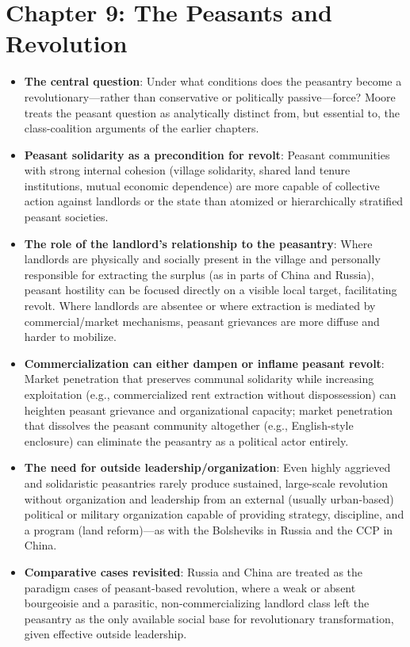 \documentclass[12pt]{article}
\begin{document}
\section{Chapter 9: The Peasants and Revolution}

\begin{itemize}[leftmargin=*, itemsep=4pt]
    \item \textbf{The central question}: Under what conditions does the peasantry become a revolutionary---rather than conservative or politically passive---force? Moore treats the peasant question as analytically distinct from, but essential to, the class-coalition arguments of the earlier chapters.
    \item \textbf{Peasant solidarity as a precondition for revolt}: Peasant communities with strong internal cohesion (village solidarity, shared land tenure institutions, mutual economic dependence) are more capable of collective action against landlords or the state than atomized or hierarchically stratified peasant societies.
    \item \textbf{The role of the landlord's relationship to the peasantry}: Where landlords are physically and socially present in the village and personally responsible for extracting the surplus (as in parts of China and Russia), peasant hostility can be focused directly on a visible local target, facilitating revolt. Where landlords are absentee or where extraction is mediated by commercial/market mechanisms, peasant grievances are more diffuse and harder to mobilize.
    \item \textbf{Commercialization can either dampen or inflame peasant revolt}: Market penetration that preserves communal solidarity while increasing exploitation (e.g., commercialized rent extraction without dispossession) can heighten peasant grievance and organizational capacity; market penetration that dissolves the peasant community altogether (e.g., English-style enclosure) can eliminate the peasantry as a political actor entirely.
    \item \textbf{The need for outside leadership/organization}: Even highly aggrieved and solidaristic peasantries rarely produce sustained, large-scale revolution without organization and leadership from an external (usually urban-based) political or military organization capable of providing strategy, discipline, and a program (land reform)---as with the Bolsheviks in Russia and the CCP in China.
    \item \textbf{Comparative cases revisited}: Russia and China are treated as the paradigm cases of peasant-based revolution, where a weak or absent bourgeoisie and a parasitic, non-commercializing landlord class left the peasantry as the only available social base for revolutionary transformation, given effective outside leadership.

\end{itemize}
\end{document}
